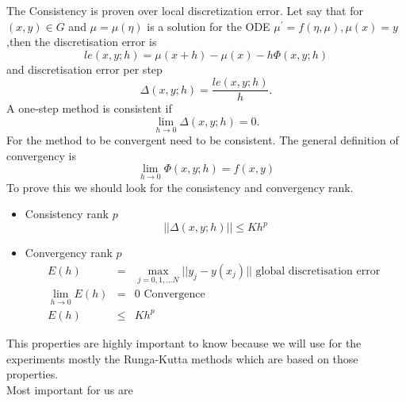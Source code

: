 The Consistency is proven over local discretization error.
Let say that for $(x,y)\in G$ and $\mu = \mu(\eta)$ is a solution for the ODE $\mu^{'} = f(\eta,\mu), \mu(x)=y$,then the discretisation error is
\begin{equation}
	le(x,y;h) = \mu(x+h)-\mu(x)-h\Phi(x,y;h)
\end{equation}
and discretisation error per step
\begin{equation}
	\Delta(x,y;h)=\frac{le(x,y;h)}{h}. 
\end{equation}
A one-step method is consistent if
\begin{equation}
	\lim_{h\rightarrow 0} \Delta(x,y;h) = 0.
\end{equation}
For the method to be convergent need to be consistent. The general definition of convergency is
\begin{equation}
\lim_{h\rightarrow 0} \Phi(x,y;h) = f(x,y)
\end{equation}
To prove this we should look for the consistency and convergency rank.
\begin{itemize}
	\item Consistency rank $p$\begin{equation}
		||\Delta(x,y;h)||\leq Kh^p
	\end{equation}
\item Convergency rank $p$
\begin{eqnarray}
	E(h) &=& \max_{j=0,1,...N}||y_j-y(x_j)||\text{ global discretisation error }\\
	\lim_{h\rightarrow 0}E(h) &=& 0 \text{ Convergence}\\
	E(h) &\leq&  Kh^p
\end{eqnarray}



\end{itemize} 
This properties are highly important to know because we will use for the experiments mostly the Runga-Kutta methods which are based on those properties.\\
Most important for us are
